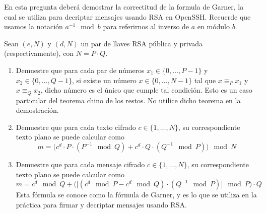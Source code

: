 
En esta pregunta deberá demostrar la correctitud de la formula de Garner, la cual se utiliza para decriptar mensajes usando RSA en OpenSSH. Recuerde que usamos la notación $a^{-1}\!\!\mod b$ para referirnos al inverso de $a$ en módulo $b$.

Sean $(e,N)$ y $(d,N)$ un par de llaves RSA pública y privada (respectivamente), con $N=P\cdot Q$. 
\begin{enumerate}
	\item \text{[2 puntos]} Demuestre que para cada par de números $x_1\in\{0,\ldots,P-1\}$ y $x_2\in\{0,\ldots,Q-1\}$, si existe un número $x\in\{0,\ldots,N-1\}$ tal que $x\equiv_P x_1$ y $x\equiv_Q x_2$, dicho número es el único que cumple tal condición. Esto es un caso particular del teorema chino de los restos. No utilice dicho teorema en la demostración.
	\item \text{[2 puntos]} Demuestre que para cada texto cifrado $c\in\{1,\ldots,N\}$, su correspondiente texto plano se puede calcular como
	$$m=\big(c^d\cdot P\cdot (P^{-1}\!\!\!\mod Q) + c^d\cdot Q\cdot (Q^{-1}\!\!\!\mod P)\big) \!\!\mod N$$
	\item \text{[2 puntos]} Demuestre que para cada mensaje cifrado $c\in\{1,\ldots,N\}$, su correspondiente texto plano se puede calcular como
	$$m=c^d\!\!\!\mod Q + \big(\big[(c^d\!\!\!\mod P - c^d\!\!\!\mod Q)\cdot (Q^{-1}\!\!\!\mod P)\big] \!\!\!\! \mod P\big) \cdot Q$$
	Esta fórmula se conoce como la fórmula de Garner, y es lo que se utiliza en la práctica para firmar y decriptar mensajes usando RSA.
\end{enumerate}

\medskip
